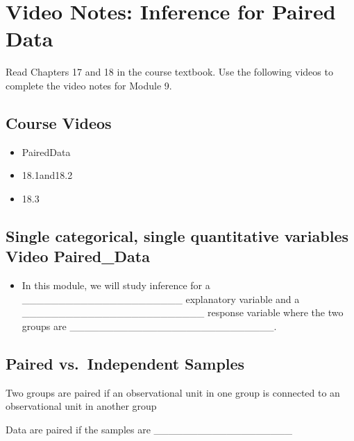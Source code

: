 \documentclass[
]{report}
\providecommand{\tightlist}{%
  \setlength{\itemsep}{0pt}\setlength{\parskip}{0pt}}
\newcommand{\rgi}{\hspace{24pt}}  %
\begin{document}
\newpage

\section{Video Notes: Inference for Paired Data}\label{video-notes-inference-for-paired-data}

Read Chapters 17 and 18 in the course textbook. Use the following videos to complete the video notes for Module 9.

\subsection{Course Videos}\label{course-videos}

\begin{itemize}
\item
  PairedData
\item
  18.1and18.2
\item
  18.3
\end{itemize}


\subsection*{Single categorical, single quantitative variables Video Paired\_Data}\label{single-categorical-single-quantitative-variables-video-paired_data}

\begin{itemize}
\tightlist
\item
  In this module, we will study inference for a \_\_\_\_\_\_\_\_\_\_\_\_\_\_\_\_\_\_\_\_\_\_ explanatory variable and a \_\_\_\_\_\_\_\_\_\_\_\_\_\_\_\_\_\_\_\_\_\_\_\_\_ response variable where the two groups are \_\_\_\_\_\_\_\_\_\_\_\_\_\_\_\_\_\_\_\_\_\_\_\_\_\_\_\_.
\end{itemize}

\subsection*{Paired vs.~Independent Samples}\label{paired-vs.-independent-samples}

Two groups are paired if an observational unit in one group is connected to an observational unit in another group

\rgi Data are paired if the samples are \_\_\_\_\_\_\_\_\_\_\_\_\_\_\_\_\_\_\_
\end{document}
